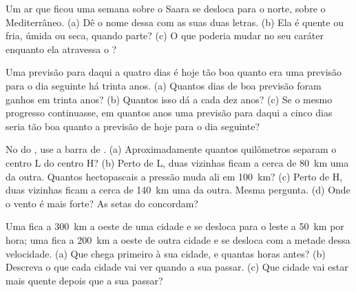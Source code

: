 \begin{exercise}[$\star\star$]\label{exo:g8:fronts-and-weather-maps:9}
Um ar que ficou uma semana sobre o Saara se desloca para o norte, sobre o
 Mediterrâneo. (a) Dê o nome dessa  com as suas duas
letras. (b) Ela é quente ou fria, úmida ou seca, quando parte? (c) O que
poderia mudar no seu caráter enquanto ela atravessa o ?
\end{exercise}

\begin{exercise}[$\star\star$]\label{exo:g8:fronts-and-weather-maps:10}
Uma previsão para daqui a quatro dias é hoje tão boa quanto era uma
previsão para o dia seguinte há trinta anos. (a) Quantos dias de boa
previsão foram ganhos em trinta anos? (b) Quantos isso dá a cada dez
anos? (c) Se o mesmo progresso continuasse, em quantos anos uma previsão
para daqui a cinco dias seria tão boa quanto a previsão de hoje para o dia
seguinte?
\end{exercise}

\begin{exercise}[$\star\star\star$]\label{exo:g8:fronts-and-weather-maps:11}
No  do , use a barra de . (a) Aproximadamente quantos
quilômetros separam o centro L do centro H? (b) Perto de L, duas 
vizinhas ficam a cerca de \qty{80}{km} uma da outra. Quantos hectopascais
a pressão muda ali em \qty{100}{km}? (c) Perto de H, duas 
vizinhas ficam a cerca de \qty{140}{km} uma da outra. Mesma pergunta.
(d) Onde o vento é mais forte? As setas do  concordam?
\end{exercise}

\begin{exercise}[$\star\star\star$]\label{exo:g8:fronts-and-weather-maps:12}
Uma  fica a \qty{300}{km} a oeste de uma cidade e se desloca
para o leste a \qty{50}{km} por hora; uma  fica a
\qty{200}{km} a oeste de outra cidade e se desloca com a metade dessa
velocidade. (a) Que  chega primeiro à sua cidade, e quantas horas
antes? (b) Descreva o  que cada cidade vai ver quando a sua 
passar. (c) Que cidade vai estar mais quente depois que a sua 
passar?
\end{exercise}

